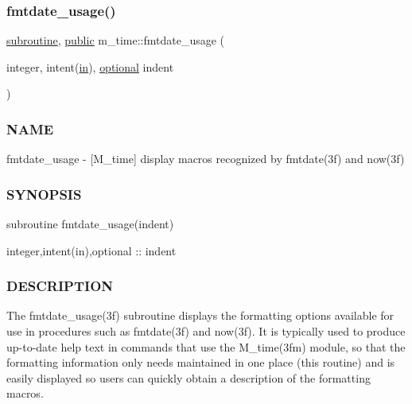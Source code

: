 \mbox{\label{namespacem__time_a914927f70fb9495af1be2e484b967111}} 
\subsubsection{\texorpdfstring{fmtdate\+\_\+usage()}{fmtdate\_usage()}}
{\footnotesize\ttfamily \hyperlink{M__stopwatch_83_8txt_acfbcff50169d691ff02d4a123ed70482}{subroutine}, \hyperlink{M__stopwatch_83_8txt_a2f74811300c361e53b430611a7d1769f}{public} m\+\_\+time\+::fmtdate\+\_\+usage (\begin{DoxyParamCaption}\item[{integer, intent(\hyperlink{M__journal_83_8txt_afce72651d1eed785a2132bee863b2f38}{in}), \hyperlink{option__stopwatch_83_8txt_aa4ece75e7acf58a4843f70fe18c3ade5}{optional}}]{indent }\end{DoxyParamCaption})}



\subsubsection*{N\+A\+ME}

fmtdate\+\_\+usage -\/ \mbox{[}M\+\_\+time\mbox{]} display macros recognized by fmtdate(3f) and now(3f) 

\subsubsection*{S\+Y\+N\+O\+P\+S\+IS}

\begin{DoxyVerb}subroutine fmtdate_usage(indent)

 integer,intent(in),optional      :: indent
\end{DoxyVerb}


\subsubsection*{D\+E\+S\+C\+R\+I\+P\+T\+I\+ON}

\begin{DoxyVerb} The fmtdate_usage(3f) subroutine displays the formatting options
 available for use in procedures such as fmtdate(3f) and now(3f).
 It is typically used to produce up-to-date help text in commands
 that use the M_time(3fm) module, so that the formatting information
 only needs maintained in one place (this routine) and is easily
 displayed so users can quickly obtain a description of the formatting
 macros.
\end{DoxyVerb}



